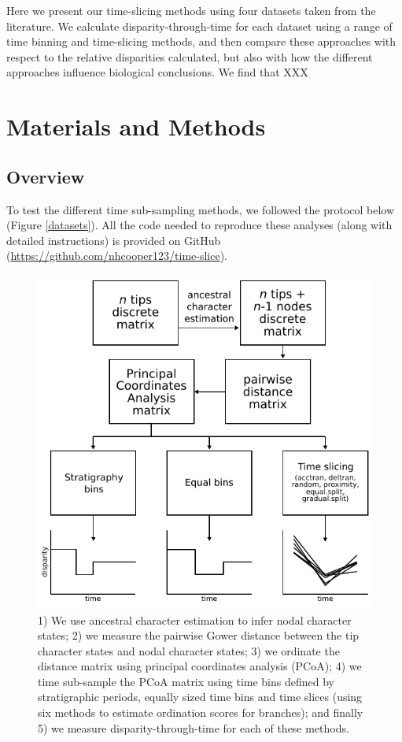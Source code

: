 \documentclass[12pt,a4paper]{article}
\begin{document}
Here we present our time-slicing methods using four datasets taken from the literature.
We calculate disparity-through-time for each dataset using a range of time binning and time-slicing methods, and then compare these approaches with respect to the relative disparities calculated, but also with how the different approaches influence biological conclusions. We find that XXX

\section{Materials and Methods}
\subsection{Overview}
\label{overview-section}
To test the different time sub-sampling methods, we followed the protocol below (Figure \ref{datasets}). 
All the code needed to reproduce these analyses (along with detailed instructions) is provided on GitHub (\url{https://github.com/nhcooper123/time-slice}).

  \begin{figure}[!htbp]
    \centering
    \includegraphics[width=1\linewidth, height=1\textheight, keepaspectratio]{figures/outlinesvg.pdf}
    \caption[Outline of the disparity-through-time pipeline]
    {1) We use ancestral character estimation to infer nodal character states; 2) we measure the pairwise Gower distance between the tip character states and nodal character states; 3) we ordinate the distance matrix using principal coordinates analysis (PCoA); 4) we time sub-sample the PCoA matrix using time bins defined by stratigraphic periods, equally sized time bins and time slices (using six methods to estimate ordination scores for branches); and finally 5) we measure disparity-through-time for each of these methods.}
    \label{overview}
  \end{figure}
\end{document}
